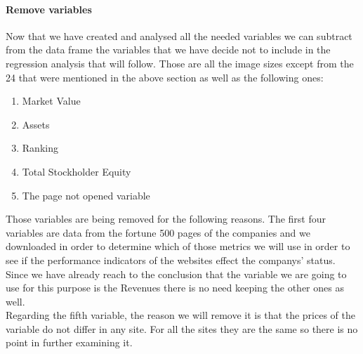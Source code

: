 \documentclass{article}
\begin{document}
\paragraph{Remove variables}
Now that we have created and analysed all the needed variables we can subtract from the data frame the variables that we have decide not to include in the regression analysis that will follow. Those are all the image sizes except from the 24 that were mentioned in the above section as well as the following ones:
\begin{enumerate}
\item Market Value 
\item Assets
\item Ranking
\item Total Stockholder Equity
\item The page not opened variable
\end{enumerate}
Those variables are being removed for the following reasons. The first four variables are data from the fortune 500 pages of the companies and we downloaded in order to determine which of those metrics we will use in order to see if the performance indicators of the websites effect the companys' status. Since we have already reach to the conclusion that the variable we are going to use for this purpose is the Revenues there is no need keeping the other ones as well.\\
Regarding the fifth variable, the reason we will remove it is that the prices of the variable do not differ in any site. For all the sites they are the same so there is no point in further examining it.
\end{document}
